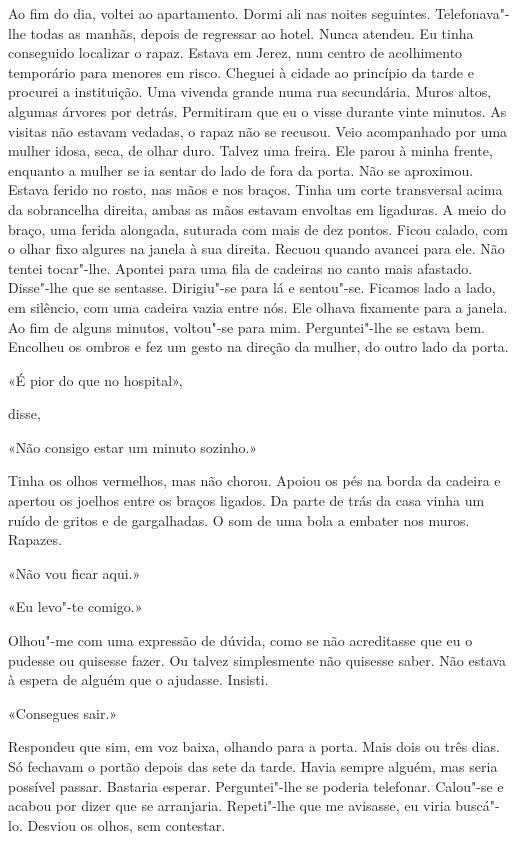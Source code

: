 Ao fim do dia, voltei ao apartamento. Dormi ali nas noites seguintes.
Telefonava"-lhe todas as manhãs, depois de regressar ao hotel. Nunca
atendeu. Eu tinha conseguido localizar o rapaz. Estava em Jerez, num
centro de acolhimento temporário para menores em risco. Cheguei à cidade
ao princípio da tarde e procurei a instituição. Uma vivenda grande numa
rua secundária. Muros altos, algumas árvores por detrás. Permitiram que
eu o visse durante vinte minutos. As visitas não estavam vedadas, o
rapaz não se recusou. Veio acompanhado por uma mulher idosa, seca, de
olhar duro. Talvez uma freira. Ele parou à minha frente, enquanto a
mulher se ia sentar do lado de fora da porta. Não se aproximou. Estava
ferido no rosto, nas mãos e nos braços. Tinha um corte transversal acima
da sobrancelha direita, ambas as mãos estavam envoltas em ligaduras. A
meio do braço, uma ferida alongada, suturada com mais de dez pontos.
Ficou calado, com o olhar fixo algures na janela à sua direita. Recuou
quando avancei para ele. Não tentei tocar"-lhe. Apontei para uma fila de
cadeiras no canto mais afastado. Disse"-lhe que se sentasse. Dirigiu"-se
para lá e sentou"-se. Ficamos lado a lado, em silêncio, com uma cadeira
vazia entre nós. Ele olhava fixamente para a janela. Ao fim de alguns
minutos, voltou"-se para mim. Perguntei"-lhe se estava bem. Encolheu os
ombros e fez um gesto na direção da mulher, do outro lado da porta.

«É pior do que no hospital»,

disse,

«Não consigo estar um minuto sozinho.»

Tinha os olhos vermelhos, mas não chorou. Apoiou os pés na borda da
cadeira e apertou os joelhos entre os braços ligados. Da parte de trás
da casa vinha um ruído de gritos e de gargalhadas. O som de uma bola a
embater nos muros. Rapazes.

«Não vou ficar aqui.»

«Eu levo"-te comigo.»

Olhou"-me com uma expressão de dúvida, como se não acreditasse que eu o
pudesse ou quisesse fazer. Ou talvez simplesmente não quisesse saber.
Não estava à espera de alguém que o ajudasse. Insisti.

«Consegues sair.»

Respondeu que sim, em voz baixa, olhando para a porta. Mais dois ou três
dias. Só fechavam o portão depois das sete da tarde. Havia sempre
alguém, mas seria possível passar. Bastaria esperar. Perguntei"-lhe se
poderia telefonar. Calou"-se e acabou por dizer que se arranjaria.
Repeti"-lhe que me avisasse, eu viria buscá"-lo. Desviou os olhos, sem
contestar.

